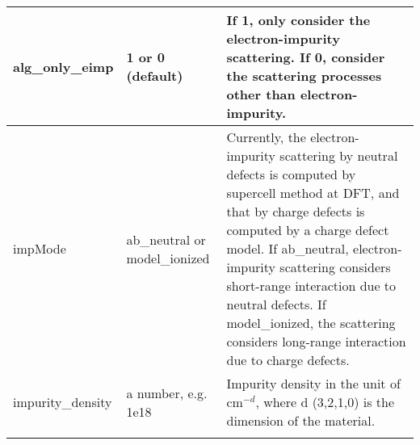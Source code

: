 \documentclass{article}
\begin{document}
\begin{xltabular}{\textwidth}{X X X}
		alg\_only\_eimp & 1 or 0 (default) & If 1, only consider the electron-impurity scattering. If 0, consider the scattering processes other than electron-impurity.\\
		\midrule
		
		impMode & ab\_neutral or model\_ionized & Currently, the electron-impurity scattering by neutral defects is computed by supercell method at DFT, and that by charge defects is computed by a charge defect model. If ab\_neutral, electron-impurity scattering considers short-range interaction due to neutral defects. If model\_ionized, the scattering considers long-range interaction due to charge defects.\\
		\midrule
		
		impurity\_density & a number, e.g. 1e18 & Impurity density in the unit of cm$^{-d}$, where d (3,2,1,0) is the dimension of the material.\\
		\midrule
		
		\bottomrule\bottomrule
		\label{tab:dmd}
	\end{xltabular}
	
	
\end{document}
